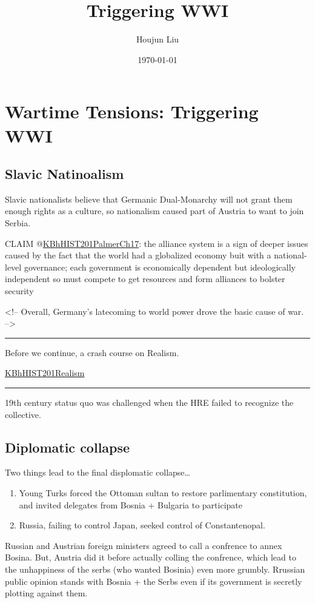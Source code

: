\documentclass[letterpaper]{article}
\author{Houjun Liu}
\date{\today}
\title{Triggering WWI}
\renewcommand{\tableofcontents}{}
\begin{document}
\tableofcontents



\section{Wartime Tensions: Triggering WWI}
\label{sec:orge9046f3}
\subsection{Slavic Natinoalism}
\label{sec:org4172ebf}
Slavic nationalists believe that Germanic Dual-Monarchy will not grant
them enough rights as a culture, so nationalism caused part of Austria
to want to join Serbia.

CLAIM @\href{KBhHIST201PalmerCh17.org}{KBhHIST201PalmerCh17}: the
alliance system is a sign of deeper issues caused by the fact that the
world had a globalized economy buit with a national-level governance;
each government is economically dependent but ideologically independent
so must compete to get resources and form alliances to bolster security

\begin{html}
<!-- Overall, Germany’s latecoming to world power drove the basic cause of war. -->
\end{html}

\noindent\rule{\textwidth}{0.5pt}

Before we continue, a crash course on Realism.

\href{KBhHIST201Realism.org}{KBhHIST201Realism}

\noindent\rule{\textwidth}{0.5pt}

19th century status quo was challenged when the HRE failed to recognize
the collective.

\subsection{Diplomatic collapse}
\label{sec:orgb21ee9f}
Two things lead to the final displomatic collapse\ldots{}

\begin{enumerate}
\item Young Turks forced the Ottoman sultan to restore parlimentary
constitution, and invited delegates from Bosnia + Bulgaria to
participate
\item Russia, failing to control Japan, seeked control of Constantenopal.
\end{enumerate}

Russian and Austrian foreign ministers agreed to call a confrence to
annex Bosina. But, Austria did it before actually colling the confrence,
which lead to the unhappiness of the serbs (who wanted Bosinia) even
more grumbly. Rrussian public opinion stands with Bosnia + the Serbs
even if its government is secretly plotting against them.
\end{document}
